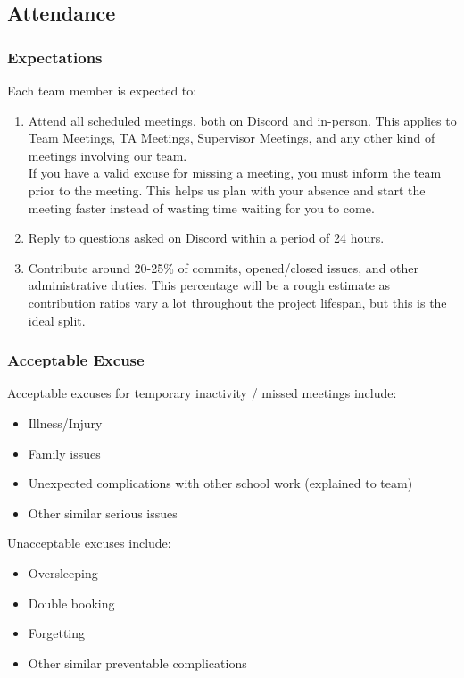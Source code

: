 \documentclass{article}
\begin{document}
\subsection*{Attendance}

\subsubsection*{Expectations}

Each team member is expected to:
\begin{enumerate}
\item{Attend all scheduled meetings, both on Discord and in-person. This applies to Team Meetings, TA Meetings, Supervisor Meetings, and any other kind of meetings involving our team.\\ If you have a valid excuse for missing a meeting, you must inform the team prior to the meeting. This helps us plan with your absence and start the meeting faster instead of wasting time waiting for you to come.}
\item{Reply to questions asked on Discord within a period of 24 hours.}
\item{Contribute around 20-25\% of commits, opened/closed issues, and other administrative duties. This percentage will be a rough estimate as contribution ratios vary a lot throughout the project lifespan, but this is the ideal split.}
\end{enumerate}

\subsubsection*{Acceptable Excuse}

Acceptable excuses for temporary inactivity / missed meetings include:
\begin{itemize}
\item{Illness/Injury}
\item{Family issues}
\item{Unexpected complications with other school work (explained to team)}
\item{Other similar serious issues}
\end{itemize}

Unacceptable excuses include:
\begin{itemize}
\item{Oversleeping}
\item{Double booking}
\item{Forgetting}
\item{Other similar preventable complications
}
\end{itemize}
\end{document}
